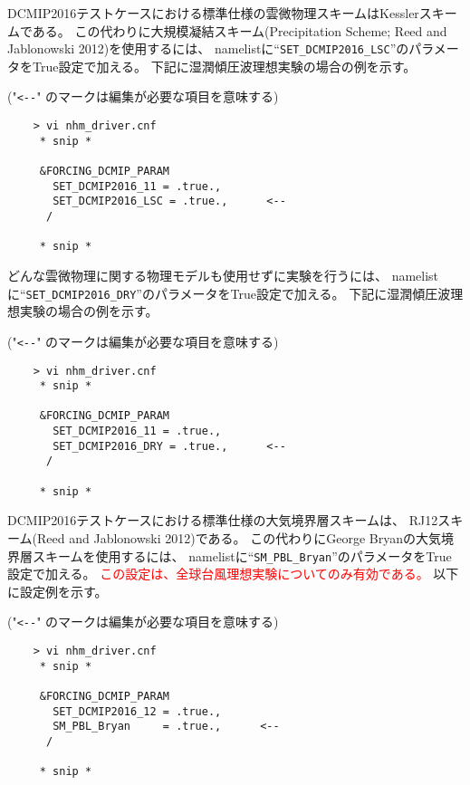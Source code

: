 
 \noindent DCMIP2016テストケースにおける標準仕様の雲微物理スキームはKesslerスキームである。
この代わりに大規模凝結スキーム(Precipitation Scheme; Reed and Jablonowski 2012)を使用するには、
namelistに``\verb|SET_DCMIP2016_LSC|''のパラメータをTrue設定で加える。
下記に湿潤傾圧波理想実験の場合の例を示す。

 ("\verb|<--|" のマークは編集が必要な項目を意味する)
 \begin{verbatim}
    > vi nhm_driver.cnf
     * snip *

     &FORCING_DCMIP_PARAM
       SET_DCMIP2016_11 = .true.,
       SET_DCMIP2016_LSC = .true.,      <--
      /

     * snip *
 \end{verbatim}



 \noindent どんな雲微物理に関する物理モデルも使用せずに実験を行うには、
namelistに``\verb|SET_DCMIP2016_DRY|''のパラメータをTrue設定で加える。
下記に湿潤傾圧波理想実験の場合の例を示す。

 ("\verb|<--|" のマークは編集が必要な項目を意味する)
 \begin{verbatim}
    > vi nhm_driver.cnf
     * snip *

     &FORCING_DCMIP_PARAM
       SET_DCMIP2016_11 = .true.,
       SET_DCMIP2016_DRY = .true.,      <--
      /

     * snip *
 \end{verbatim}


 \noindent DCMIP2016テストケースにおける標準仕様の大気境界層スキームは、
RJ12スキーム(Reed and Jablonowski 2012)である。
この代わりにGeorge Bryanの大気境界層スキームを使用するには、
namelistに``\verb|SM_PBL_Bryan|''のパラメータをTrue設定で加える。
\textcolor{red}{この設定は、全球台風理想実験についてのみ有効である。}
以下に設定例を示す。


 ("\verb|<--|" のマークは編集が必要な項目を意味する)
 \begin{verbatim}
    > vi nhm_driver.cnf
     * snip *

     &FORCING_DCMIP_PARAM
       SET_DCMIP2016_12 = .true.,
       SM_PBL_Bryan     = .true.,      <--
      /

     * snip *
 \end{verbatim}


